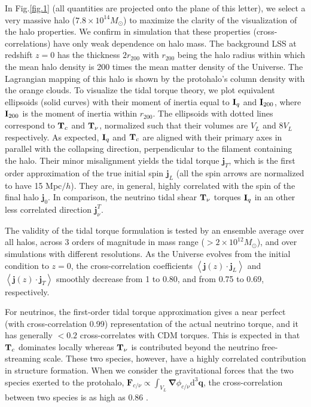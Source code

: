 \documentclass[aps,prd,twocolumn,amsmath,amssymb,amsfont,superscriptaddress,nofootinbib]{revtex4-1}
\newcommand{\bs}{\boldsymbol}
\newcommand{\diff}{{\mathrm d}}
\newcommand{\T}{\bold{T}}
\newcommand{\I}{\bold{I}}
\newcommand{\spin}{\bs{j}}
\begin{document}
In Fig.\ref{fig.1} (all quantities are projected onto the plane of this letter), 
we select a very massive halo ($7.8\times 10^{14}M_\odot$) to maximize the clarity of the visualization of the halo properties.
We confirm in simulation that these properties (cross-correlations) have only weak dependence on halo mass. 
The background LSS at redshift $z=0$ has the thickness $2r_{200}$ with $r_{200}$ being the halo radius within which the mean halo density is 200 times the mean matter density of the Universe.
The Lagrangian mapping of this halo is shown by the protohalo's column density with the orange clouds.
To visualize the tidal torque theory, we plot equivalent ellipsoids (solid curves) with their moment of inertia equal to $\I_q$ and 
$\I_{200}$, where $\I_{200}$ is the moment of inertia within $r_{200}$. 
The ellipsoids with dotted lines correspond to $\T_c$ and $\T_\nu$, normalized such that their volumes are $V_L$ and $8V_L$ respectively. 
As expected, $\I_q$ and $\T_c$ are aligned with their primary axes in parallel with the collapsing direction,  perpendicular to the filament containing the halo. 
Their minor misalignment yields the tidal torque $\spin_T$, which is the first order approximation of the true initial spin $\spin_L$ (all the spin arrows are normalized to have 15 Mpc$/h$). 
They are, in general, highly correlated with the spin of the final halo $\spin_0$.
In comparison, the neutrino tidal shear $\T_\nu$ torques $\I_q$ in an other less correlated direction $\spin^T_\nu$.

The validity of the tidal torque formulation is tested by an ensemble average over all halos, 
across 3 orders of magnitude in mass range ($>2\times10^{12}M_\odot$), and over simulations with different resolutions.
As the Universe evolves from the initial condition to $z=0$, the cross-correlation coefficients $\left\langle \spin(z) \cdot \spin_L \right\rangle$ and
$\left\langle \spin(z) \cdot \spin_T \right\rangle$ smoothly decrease from 1 to 0.80, and
from 0.75 to 0.69, respectively.

For neutrinos, the first-order tidal torque approximation gives a near perfect (with cross-correlation 0.99) representation of the actual neutrino torque, and it has generally $<0.2$ cross-correlates with CDM torques. This is expected in that $\T_c$ dominates locally  whereas $\T_\nu$ is contributed beyond the neutrino free-streaming scale. These two species, however, have a highly correlated contribution in structure formation. When we consider the gravitational forces that the two species exerted to the protohalo, $\bs{F}_{c/\nu}\propto\int_{V_L}\bs{\nabla}\phi_{c/\nu}\diff^3\bs{q}$, the cross-correlation between two species is as high as 0.86 .
\end{document}

